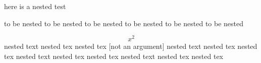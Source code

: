 here is a nested test
\begin{one}
	to be nested to be nested
	to be nested to be nested
	to be nested to be nested
	\begin{two}\[ x^2\]
		nested text nested tex nested tex [not an argument]
		nested text nested tex nested tex
		nested text nested tex nested tex
		nested text nested tex nested tex
	\end{two}
\end{one}
